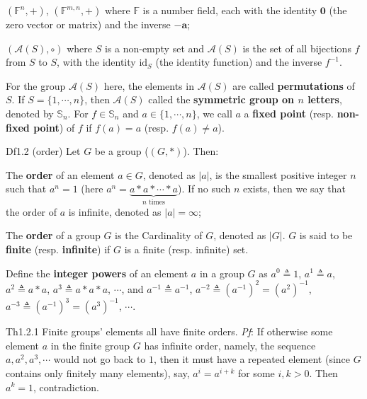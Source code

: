 \documentclass{article}
\begin{document}
\begin{Rmk}{}
\begin{compactenum}
{\begin{compactenum}
            \item $(\mathbb{F}^n, +)$, $(\mathbb{F}^{m,n}, +)$ where $\mathbb{F}$ is a number field, each with the identity $\mathbf{0}$ (the zero vector or matrix) and the inverse $-\mathbf{a}$;
            \item $(\mathcal{A}(S), \circ)$ where $S$ is a non-empty set and $\mathcal{A}(S)$ is the set of all bijections $f$ from $S$ to $S$, with the identity $\text{id}_S$ (the identity function) and the inverse $f^{-1}$.
        \end{compactenum}}
        \textcolor{Df}{For the group $\mathcal{A}(S)$ here, the elements in $\mathcal{A}(S)$ are called \textbf{permutations} of $S$. If $S = \{1, \cdots, n\}$, then $\mathcal{A}(S)$ called the \textbf{symmetric group on $n$ letters}, denoted by $\mathbb{S}_n$.} \textcolor{Df}{For $f\in\mathbb{S}_n$ and $a\in\{1,\cdots,n\}$, we call $a$ a \textbf{fixed point} (resp. \textbf{non-fixed point}) of $f$ if $f(a) = a$ (resp. $f(a) \neq a$).}
    \end{compactenum}
\end{Rmk}

\begin{Df}{Df1.2 (order)}
    Let $G$ be a group ($(G, \ast)$). Then:
    \begin{compactenum}
        \item The \textbf{order} of an element $a\in G$, denoted as $|a|$, is the smallest positive integer $n$ such that $a^n=1$ (here $a^n = \underbrace{a\ast a\ast \cdots \ast a}_{n\text{ times}}$). If no such $n$ exists, then we say that the order of $a$ is infinite, denoted as $|a|=\infty$;
        \item The \textbf{order} of a group $G$ is the Cardinality of $G$, denoted as $|G|$. $G$ is said to be \textbf{finite} (resp. \textbf{infinite}) if $G$ is a finite (resp. infinite) set.
    \end{compactenum}
\end{Df}

\begin{Rmk}{}
    \textcolor{Df}{Define the \textbf{integer powers} of an element $a$ in a group $G$ as $a^0\triangleq 1$, $a^1\triangleq a$, $a^2\triangleq a\ast a$, $a^3\triangleq a\ast a\ast a$, $\cdots$, and $a^{-1}\triangleq a^{-1}$, $a^{-2}\triangleq (a^{-1})^2 = (a^2)^{-1}$, $a^{-3}\triangleq (a^{-1})^3 = (a^3)^{-1}$, $\cdots$.}
\end{Rmk}

\begin{Th}{Th1.2.1}
    Finite groups' elements all have finite orders.
    \tcblower
    \textit{Pf}: If otherwise some element $a$ in the finite group $G$ has infinite order, namely, the sequence $a, a^2, a^3, \cdots$ would not go back to $1$, then it must have a repeated element (since $G$ contains only finitely many elements), say, $a^i=a^{i+k}$ for some $i, k>0$. Then $a^k = 1$, contradiction.
\end{Th}
\end{document}

